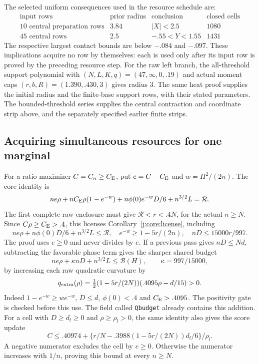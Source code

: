 The selected uniform consequences used in the resource schedule are:
\[
\begin{array}{l|c|c|r}
\text{input rows}&\text{prior radius}&\text{conclusion}&\text{closed cells}\\\hline
10\text{ central preparation rows}&3.84&|X|<2.5&1080\\
45\text{ central rows}&2.5&-.55<Y<1.55&1431
\end{array}
\]
The respective largest contact bounds are below $-.084$ and $-.097$.
These implications acquire no row by themselves: each is used only after
its input row is proved by the preceding resource step.
For the raw left branch, the all-threshold support polynomial with
$(N,L,K,q)=(47,\infty,0,.19)$ and actual moment caps
$(r,b,R)=(1.390,.430,3)$ gives radius $3$.
The same heat proof supplies the initial radius and the finite-base
support rows, with their stated parameters. The bounded-threshold series
supplies the central contraction and coordinate strip above, and the
separately specified earlier finite strips.


\subsection{Acquiring simultaneous resources for one marginal}\label{j:local:sign}
For a ratio maximizer $C=C_n\ge C_{\mathrm E}$, put $e=C-C_{\mathrm E}$ and $w=H^2/(2n)$.
The core identity is
\[
 ne\rho+nC_{\mathrm E}\rho(1-e^{-w})+n\phi(0)e^{-w}D/6+n^{3/2}L=\mathcal R.
\]
The first complete raw enclosure must give $\mathcal R<r<.4N$, for the
actual $n\ge N$. Since $C\rho\ge C_{\mathrm E}>.4$, this licenses
Corollary~\ref{j:core:license}, including
\[
 ne\rho+n\phi(0)D/6+n^{3/2}L\le\mathcal R,\quad
 e^{-w}\ge1-5r/(2n),\quad nD\le15000r/997.
\]
The proof uses $e\ge0$ and never divides by $e$.
If a previous pass gives $nD\le Nd$, subtracting the favorable phase
term gives the sharper shared budget
\begin{equation}\label{j:local:budget}
 ne\rho+\kappa nD+n^{3/2}L\le\mathcal B(H),\qquad\kappa=997/15000,
\end{equation}
by increasing each raw quadratic curvature by
\begin{equation}\label{j:local:re:extra}
 q_{\rm extra}(\rho)=\tfrac12(1-5r/(2N))(.4095\rho-d/15)>0.
\end{equation}
Indeed $1-e^{-w}\ge we^{-w}$, $D\le d$, $\phi(0)<.4$ and
$C_{\mathrm E}>.4095$. The positivity gate is checked before this use.
The field called \texttt{Qbudget} already contains this addition.
For a cell with $D\ge d_l\ge0$ and $\rho\ge\rho_l>0$, the same identity
also gives the score update
\[
 C\le .40974+\{r/N-.3988(1-5r/(2N))d_l/6\}/\rho_l.
\]
A negative numerator excludes the cell by $e\ge0$. Otherwise the numerator
increases with $1/n$, proving this bound at every $n\ge N$.


